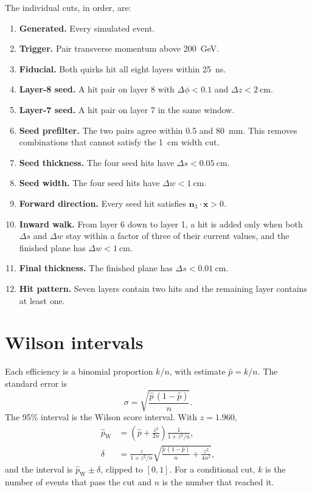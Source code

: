 \documentclass[11pt,a4paper]{article}
\begin{document}
The individual cuts, in order, are:
\begin{enumerate}
\item \textbf{Generated.} Every simulated event.
\item \textbf{Trigger.} Pair transverse momentum above \SI{200}{\GeV}.
\item \textbf{Fiducial.} Both quirks hit all eight layers within \SI{25}{\ns}.
\item \textbf{Layer-8 seed.} A hit pair on layer 8 with \(\Delta\phi < 0.1\) and \(\Delta z < \SI{2}{\cm}\).
\item \textbf{Layer-7 seed.} A hit pair on layer 7 in the same window.
\item \textbf{Seed prefilter.} The two pairs agree within \SI{0.5}{\rad} and \SI{80}{\mm}. This removes combinations that cannot satisfy the \SI{1}{\cm} width cut.
\item \textbf{Seed thickness.} The four seed hits have \(\Delta s < \SI{0.05}{\cm}\).
\item \textbf{Seed width.} The four seed hits have \(\Delta w < \SI{1}{\cm}\).
\item \textbf{Forward direction.} Every seed hit satisfies \(\boldsymbol{n}_3\cdot\boldsymbol{x} > 0\).
\item \textbf{Inward walk.} From layer 6 down to layer 1, a hit is added only when both \(\Delta s\) and \(\Delta w\) stay within a factor of three of their current values, and the finished plane has \(\Delta w < \SI{1}{\cm}\).
\item \textbf{Final thickness.} The finished plane has \(\Delta s < \SI{0.01}{\cm}\).
\item \textbf{Hit pattern.} Seven layers contain two hits and the remaining layer contains at least one.
\end{enumerate}

\section{Wilson intervals}
Each efficiency is a binomial proportion \(k/n\), with estimate \(\hat{p} = k/n\).
The standard error is
\begin{equation}
\sigma = \sqrt{\frac{\hat{p}\,(1-\hat{p})}{n}}.
\label{eq:se}
\end{equation}
The 95\% interval is the Wilson score interval. With \(z = 1.960\),
\begin{equation}
\begin{aligned}
\hat{p}_{\mathrm{W}}
&=
\left(\hat{p} + \frac{z^{2}}{2n}\right)
\frac{1}{1 + z^{2}/n},
\\
\delta
&=
\frac{z}{1 + z^{2}/n}
\sqrt{
  \frac{\hat{p}\,(1-\hat{p})}{n}
  + \frac{z^{2}}{4n^{2}}
},
\end{aligned}
\label{eq:wilson}
\end{equation}
and the interval is \(\hat{p}_{\mathrm{W}} \pm \delta\), clipped to \([0,1]\).
For a conditional cut, \(k\) is the number of events that pass the cut and \(n\) is the number that reached it.
\end{document}
